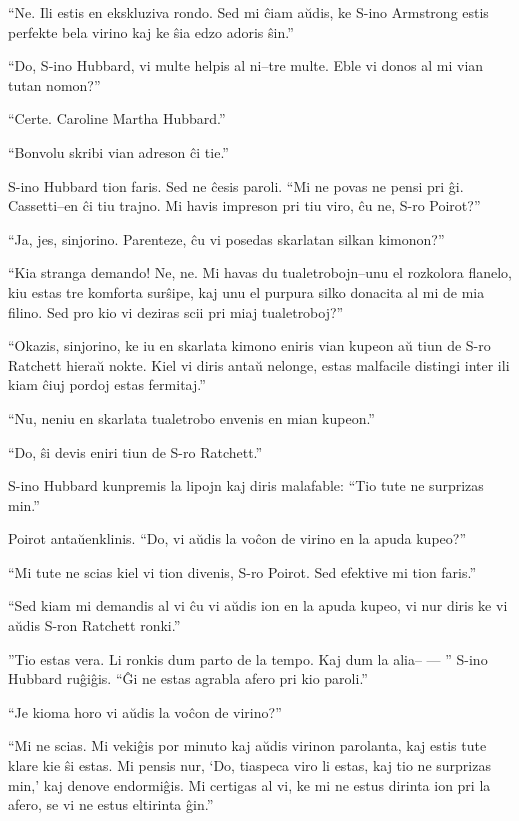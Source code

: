 ``Ne. Ili estis en ekskluziva rondo. Sed mi ĉiam aŭdis, ke S-ino Armstrong estis perfekte bela virino kaj ke ŝia edzo adoris ŝin.''

``Do, S-ino Hubbard, vi multe helpis al ni--tre multe. Eble vi donos al mi vian tutan nomon?''

``Certe. Caroline Martha Hubbard.''

``Bonvolu skribi vian adreson ĉi tie.''

S-ino Hubbard tion faris. Sed ne ĉesis paroli. ``Mi ne povas ne pensi pri ĝi. Cassetti--en ĉi tiu trajno. Mi havis impreson pri tiu viro, ĉu ne, S-ro Poirot?''

``Ja, jes, sinjorino. Parenteze, ĉu vi posedas skarlatan silkan kimonon?''

``Kia stranga demando! Ne, ne. Mi havas du tualetrobojn--unu el rozkolora flanelo, kiu estas tre komforta surŝipe, kaj unu el purpura silko donacita al mi de mia filino. Sed pro kio vi deziras scii pri miaj tualetroboj?''

``Okazis, sinjorino, ke iu en skarlata kimono eniris vian kupeon aŭ tiun de S-ro Ratchett hieraŭ nokte. Kiel vi diris antaŭ nelonge, estas malfacile distingi inter ili kiam ĉiuj pordoj estas fermitaj.''

``Nu, neniu en skarlata tualetrobo envenis en mian kupeon.''

``Do, ŝi devis eniri tiun de S-ro Ratchett.''

S-ino Hubbard kunpremis la lipojn kaj diris malafable: ``Tio tute ne surprizas min.''

Poirot antaŭenklinis. ``Do, vi aŭdis la voĉon de virino en la apuda kupeo?''

``Mi tute ne scias kiel vi tion divenis, S-ro Poirot. Sed efektive mi tion faris.''

``Sed kiam mi demandis al vi ĉu vi aŭdis ion en la apuda kupeo, vi nur diris ke vi aŭdis S-ron Ratchett ronki.''

''Tio estas vera. Li ronkis dum parto de la tempo. Kaj dum la alia-- --- '' S-ino Hubbard ruĝiĝis. ``Ĝi ne estas agrabla afero pri kio paroli.''

``Je kioma horo vi aŭdis la voĉon de virino?''

``Mi ne scias. Mi vekiĝis por minuto kaj aŭdis virinon parolanta, kaj estis tute klare kie ŝi estas. Mi pensis nur, `Do, tiaspeca viro li estas, kaj tio ne surprizas min,' kaj denove endormiĝis. Mi certigas al vi, ke mi ne estus dirinta ion pri la afero, se vi ne estus eltirinta ĝin.''

